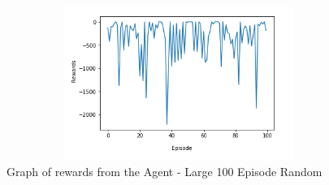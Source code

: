 \begin{itemize}
\begin{figure}[H]
    \centering
    \includegraphics[width=120mm, height=50mm]{img/random100results.PNG}
    \caption{Graph of rewards from the Agent - Large 100 Episode Random}
    \label{fig:100EpLarge}
\end{figure}

\end{itemize}